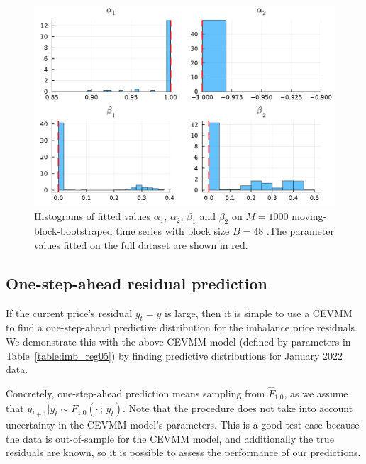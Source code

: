 \documentclass[11pt,twoside,openany]{book}
\numberwithin{Theorem}{chapter}
\numberwithin{Definition}{chapter}
\numberwithin{Lemma}{chapter}
\numberwithin{Algorithm}{chapter}
\numberwithin{equation}{chapter}
\begin{document}
\begin{figure}[htp]
  \centering
  \includegraphics[scale=0.7]{../elexon/figures/parameter_uncert_k2.pdf}
  \caption{Histograms of fitted values $\alpha_1$, $\alpha_2$, $\beta_1$ and $\beta_2$ on $M=1000$ moving-block-bootstraped time series with block size $B=48$ .The parameter values fitted
on the full dataset are shown in red.}\label{fig:parameter_uncert_k2}
\end{figure}

\FloatBarrier
\subsection{One-step-ahead residual prediction}

If the current price's residual $y_t=y$ is large, then it is simple to use a CEVMM to find
a one-step-ahead predictive distribution for the imbalance price residuals.
We demonstrate this with the above CEVMM model (defined by parameters in Table~\ref{table:imb_reg05})
by finding predictive distributions for January 2022 data.

Concretely, one-step-ahead prediction means sampling from $\hat F_{1|0}$,
as we assume that $y_{t+1}|y_{t} \sim F_{1|0}(\cdot\,;\,y_t)$.
Note that the procedure does not take into account uncertainty in the CEVMM
model's parameters.
This
is a good test case because the data is out-of-sample for the CEVMM model,
and additionally the true residuals are known, so it is possible to assess the
performance of our predictions.


\end{document}
